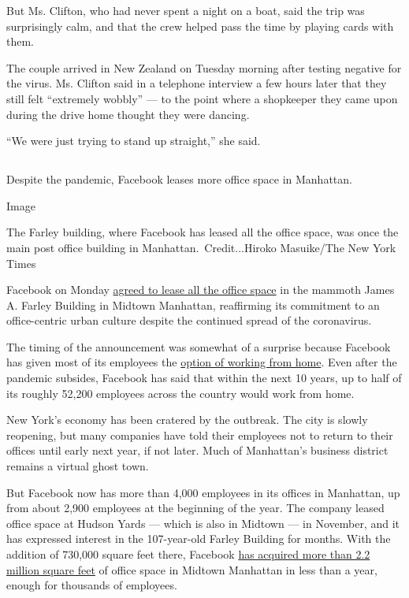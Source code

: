 But Ms. Clifton, who had never spent a night on a boat, said the trip
was surprisingly calm, and that the crew helped pass the time by playing
cards with them.

The couple arrived in New Zealand on Tuesday morning after testing
negative for the virus. Ms. Clifton said in a telephone interview a few
hours later that they still felt ``extremely wobbly'' --- to the point
where a shopkeeper they came upon during the drive home thought they
were dancing.

``We were just trying to stand up straight,'' she said.

\hypertarget{-7}{%
\subsection{}\label{-7}}

Despite the pandemic, Facebook leases more office space in Manhattan.

Image

The Farley building, where Facebook has leased all the office space, was
once the main post office building in Manhattan.~Credit...Hiroko
Masuike/The New York Times

Facebook on Monday
\href{https://www.nytimes.com/2020/08/03/nyregion/facebook-nyc-office-farley-building.html}{agreed
to lease all the office space} in the mammoth James A. Farley Building
in Midtown Manhattan, reaffirming its commitment to an office-centric
urban culture despite the continued spread of the coronavirus.

The timing of the announcement was somewhat of a surprise because
Facebook has given most of its employees the
\href{https://www.nytimes.com/2020/05/21/technology/facebook-remote-work-coronavirus.html}{option
of working from home}. Even after the pandemic subsides, Facebook has
said that within the next 10 years, up to half of its roughly 52,200
employees across the country would work from home.

New York's economy has been cratered by the outbreak. The city is slowly
reopening, but many companies have told their employees not to return to
their offices until early next year, if not later. Much of Manhattan's
business district remains a virtual ghost town.

But Facebook now has more than 4,000 employees in its offices in
Manhattan, up from about 2,900 employees at the beginning of the year.
The company leased office space at Hudson Yards --- which is also in
Midtown --- in November, and it has expressed interest in the
107-year-old Farley Building for months. With the addition of 730,000
square feet there, Facebook
\href{https://www.nytimes.com/2020/01/05/nyregion/nyc-tech-facebook-amazon-google.html}{has
acquired more than 2.2 million square feet} of office space in Midtown
Manhattan in less than a year, enough for thousands of employees.

